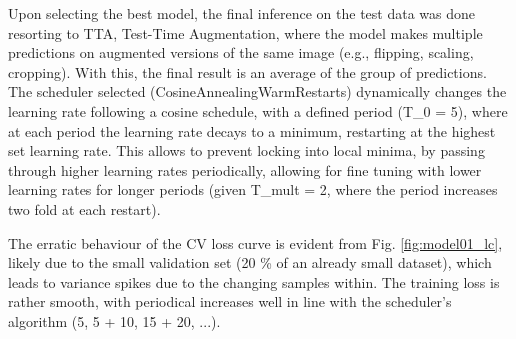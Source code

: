 \documentclass[conference]{IEEEtran}
\begin{document}

Upon selecting the best model, the final inference on the test data was done resorting to TTA, Test-Time Augmentation, where the model makes multiple predictions on augmented versions of the same image (e.g., flipping, scaling, cropping). With this, the final result is an average of the group of predictions. The scheduler selected (CosineAnnealingWarmRestarts) dynamically changes the learning rate following a cosine schedule, with a defined period (T\_0 = 5), where at each period the learning rate decays to a minimum, restarting at the highest set learning rate. This allows to prevent locking into local minima, by passing through higher learning rates periodically, allowing for fine tuning with lower learning rates for longer periods (given T\_mult = 2, where the period increases two fold at each restart).

The erratic behaviour of the CV loss curve is evident from Fig. \ref{fig:model01_lc}, likely due to the small validation set (20 \% of an already small dataset), which leads to variance spikes due to the changing samples within. The training loss is rather smooth, with periodical increases well in line with the scheduler's algorithm (5, 5 + 10, 15 + 20, ...).
\end{document}
